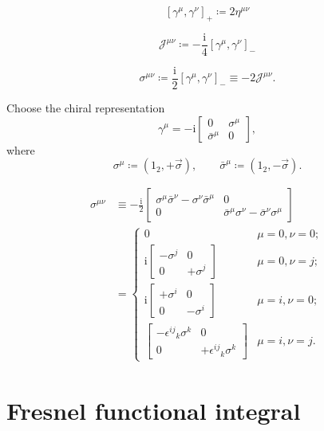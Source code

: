 \documentclass[12pt]{article}
\newcommand\mi{\mathrm{i}} %
\newcommand{\rbr}[1]{{\left(#1\right)}}
\newcommand{\sbr}[1]{{\left[#1\right]}}
\begin{document}
\citep[sec.~5]{weinberg1995}
\begin{equation}
\sbr{\gamma^\mu, \gamma^\nu}_+ \coloneqq 2\eta^{\mu\nu}
\end{equation}

\begin{equation}
\mathscr{J}^{\mu\nu} \coloneqq -\frac{\mi}{4}\sbr{\gamma^\mu, \gamma^\nu}_-
\end{equation}

\begin{equation}
\sigma^{\mu\nu} \coloneqq \frac{\mi}{2}\sbr{\gamma^\mu, \gamma^\nu}_-
\equiv -2 \mathscr{J}^{\mu\nu}.
\end{equation}

Choose the chiral representation
\begin{equation}
\gamma^\mu = -\mi
\begin{bmatrix}0 & \sigma^\mu \\ \bar\sigma^\mu & 0\end{bmatrix},
\end{equation}
where
\begin{equation}
\sigma^\mu \coloneqq \rbr{1_2, +\vec{\sigma}},\qquad
\bar\sigma^\mu \coloneqq \rbr{1_2, -\vec{\sigma}}.
\end{equation}

\begin{align}
\sigma^{\mu\nu} &\equiv -\frac{\mi}{2}
\begin{bmatrix}
\sigma^\mu\bar\sigma^\nu-\sigma^\nu\bar\sigma^\mu & 0 \\
0 & \bar\sigma^\mu\sigma^\nu-\bar\sigma^\nu\sigma^\mu
\end{bmatrix} \nonumber \\
&=
\begin{cases}
0 & \mu = 0, \nu = 0; \\
\mi \begin{bmatrix}-\sigma^j & 0 \\ 0 & +\sigma^j\end{bmatrix}
& \mu = 0, \nu = j; \\
\mi \begin{bmatrix}+\sigma^i & 0 \\ 0 & -\sigma^i\end{bmatrix}
& \mu = i, \nu = 0; \\
\begin{bmatrix}
-\epsilon^{ij}{}_k \sigma^k & 0
\\ 0 & +\epsilon^{ij}{}_k \sigma^k\end{bmatrix}
& \mu = i, \nu = j.
\end{cases}
\end{align}


\section{Fresnel functional integral}

\citep[ch.~10]{mosel2004}


\printbibliography
\end{document}
